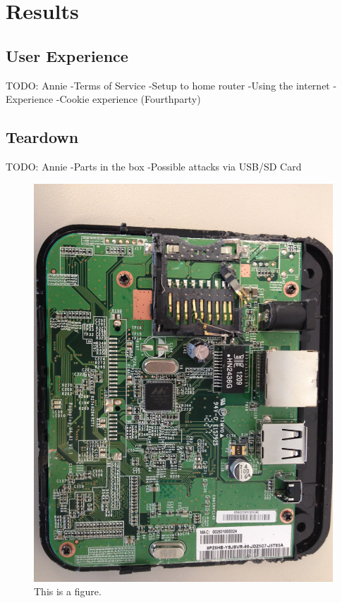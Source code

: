 \section{Results}
\label{sec:results}
\subsection{User Experience}
TODO: Annie
    -Terms of Service
    -Setup to home router
    -Using the internet
    -Experience
    -Cookie experience (Fourthparty)

\subsection{Teardown}
TODO: Annie
    -Parts in the box
    -Possible attacks via USB/SD Card

\begin{figure}[htb]
\begin{center}
\includegraphics[width=\linewidth]{safeplug_top}
\caption{This is a figure.}
\end{center}
\end{figure}

